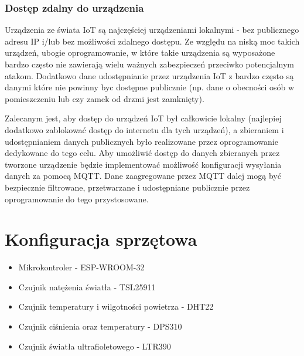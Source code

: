 \documentclass[12pt,a4paper]{article}
\begin{document}
\subsubsection{Dostęp zdalny do urządzenia}

Urządzenia ze świata IoT są najczęściej urządzeniami lokalnymi - bez publicznego adresu IP i/lub bez możliwości zdalnego dostępu.
Ze względu na niską moc takich urządzeń, ubogie oprogramowanie, w które takie urządzenia są wyposażone bardzo często nie zawierają
wielu ważnych zabezpieczeń przeciwko potencjalnym atakom. Dodatkowo dane udostępnianie przez urządzenia IoT z bardzo często są danymi które nie powinny byc dostępne publicznie
(np. dane o obecności osób w pomieszczeniu lub czy zamek od drzmi jest zamknięty). 

Zalecanym jest, aby dostęp do urządzeń IoT był całkowicie lokalny (najlepiej dodatkowo zablokować dostęp do internetu dla tych urządzeń),
a zbieraniem i udostępnianiem danych publicznych było realizowane przez oprogramowanie dedykowane do tego celu.
Aby umożliwić dostęp do danych zbieranych przez tworzone urządzenie będzie implementować możliwość konfiguracji wysyłania danych za pomocą MQTT.
Dane zaagregowane przez MQTT dalej mogą być bezpiecznie filtrowane, przetwarzane i udostępniane publicznie przez oprogramowanie do tego przystosowane.

\section{Konfiguracja sprzętowa}

\begin{itemize}
    \item Mikrokontroler - ESP-WROOM-32
    \item Czujnik natężenia światła - TSL25911
    \item Czujnik temperatury i wilgotności powietrza - DHT22
    \item Czujnik ciśnienia oraz temperatury - DPS310
    \item Czujnik światła ultrafioletowego - LTR390
\end{itemize}
\end{document}

